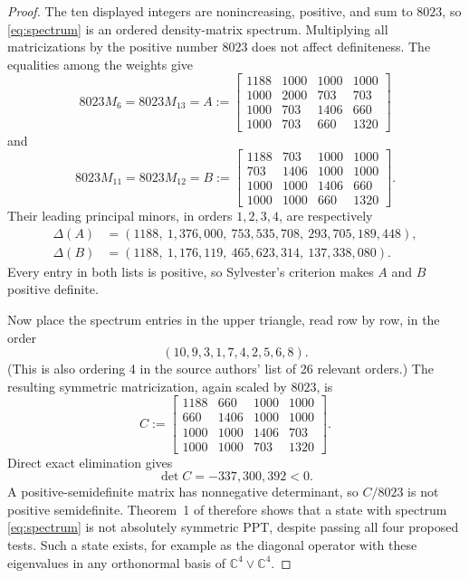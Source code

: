 \documentclass[10pt]{article}
\newcommand{\C}{\mathbb C}
\begin{document}
\begin{proof}
The ten displayed integers are nonincreasing, positive, and sum to $8023$,
so \eqref{eq:spectrum} is an ordered density-matrix spectrum.  Multiplying
all matricizations by the positive number $8023$ does not affect definiteness.
The equalities among the weights give
\[
8023M_6=8023M_{13}=A:=
\begin{bmatrix}
1188&1000&1000&1000\\
1000&2000&703&703\\
1000&703&1406&660\\
1000&703&660&1320
\end{bmatrix}
\]
and
\[
8023M_{11}=8023M_{12}=B:=
\begin{bmatrix}
1188&703&1000&1000\\
703&1406&1000&1000\\
1000&1000&1406&660\\
1000&1000&660&1320
\end{bmatrix}.
\]
Their leading principal minors, in orders $1,2,3,4$, are respectively
\begin{align*}
\Delta(A)&=(1188,\ 1{,}376{,}000,\ 753{,}535{,}708,\
293{,}705{,}189{,}448),\\
\Delta(B)&=(1188,\ 1{,}176{,}119,\ 465{,}623{,}314,\
137{,}338{,}080).
\end{align*}
Every entry in both lists is positive, so Sylvester's criterion makes $A$ and
$B$ positive definite.

Now place the spectrum entries in the upper triangle, read row by row, in the
order
\[
(10,9,3,1,7,4,2,5,6,8).
\]
(This is also ordering 4 in the source authors' list of 26 relevant orders.)
The resulting symmetric matricization, again scaled by $8023$, is
\[
C:=\begin{bmatrix}
1188&660&1000&1000\\
660&1406&1000&1000\\
1000&1000&1406&703\\
1000&1000&703&1320
\end{bmatrix}.
\]
Direct exact elimination gives
\[
\det C=-337{,}300{,}392<0.
\]
A positive-semidefinite matrix has nonnegative determinant, so $C/8023$ is
not positive semidefinite.  Theorem~1 of \cite{CJMP} therefore shows that a
state with spectrum \eqref{eq:spectrum} is not absolutely symmetric PPT,
despite passing all four proposed tests.  Such a state exists, for example as
the diagonal operator with these eigenvalues in any orthonormal basis of
$\C^4\vee\C^4$.
\end{proof}
\end{document}
